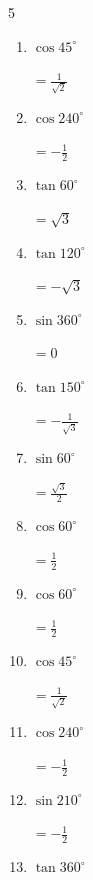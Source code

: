 \begin{multicols}{5}
\begin{enumerate}
        $\displaystyle =\frac{1}{\sqrt{3}}$

  \item $\displaystyle \cos{45^\circ}$

        $\displaystyle =\frac{1}{\sqrt{2}}$

  \item $\displaystyle \cos{240^\circ}$

        $\displaystyle =-\frac{1}{2}$

  \item $\displaystyle \tan{60^\circ}$

        $\displaystyle =\sqrt{3}$

  \item $\displaystyle \tan{120^\circ}$

        $\displaystyle =-\sqrt{3}$

  \item $\displaystyle \sin{360^\circ}$

        $\displaystyle =0$

  \item $\displaystyle \tan{150^\circ}$

        $\displaystyle =-\frac{1}{\sqrt{3}}$

  \item $\displaystyle \sin{60^\circ}$

        $\displaystyle =\frac{\sqrt{3}}{2}$

\columnbreak %

  \item $\displaystyle \cos{60^\circ}$

        $\displaystyle =\frac{1}{2}$

  \item $\displaystyle \cos{60^\circ}$

        $\displaystyle =\frac{1}{2}$

  \item $\displaystyle \cos{45^\circ}$

        $\displaystyle =\frac{1}{\sqrt{2}}$

  \item $\displaystyle \cos{240^\circ}$

        $\displaystyle =-\frac{1}{2}$

  \item $\displaystyle \sin{210^\circ}$

        $\displaystyle =-\frac{1}{2}$

  \item $\displaystyle \tan{360^\circ}$


\end{enumerate}
\end{multicols}
